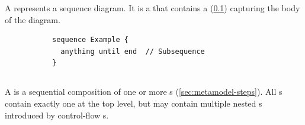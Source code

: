A \msequence{} represents a sequence diagram.  It is a \mnamedelement{}
that contains a \msubsequence{} (\cref{ssec:metamodel-sequences-subsequences})
capturing the body of the diagram.

\begin{figure}[h!]

  \begin{subfigure}[t]{\egtextwidth}
    \begin{lstlisting}[style=Example]
sequence Example {
  anything until end  // Subsequence
}
    \end{lstlisting}
  \end{subfigure}
  \hfill
  \begin{subfigure}[t]{\eggraphicalwidth}
    \gsecaption
    \centering
  \end{subfigure}

\end{figure}

\subsection{\msubsequence}\label{ssec:metamodel-sequences-subsequences}

A \msubsequence{} is a sequential composition of one or more \msequencestep s
(\cref{sec:metamodel-steps}).
All \msequence s contain exactly one \msubsequence{} at the top level, but
may contain multiple nested \msubsequence s introduced by control-flow
\msequencestep s.

